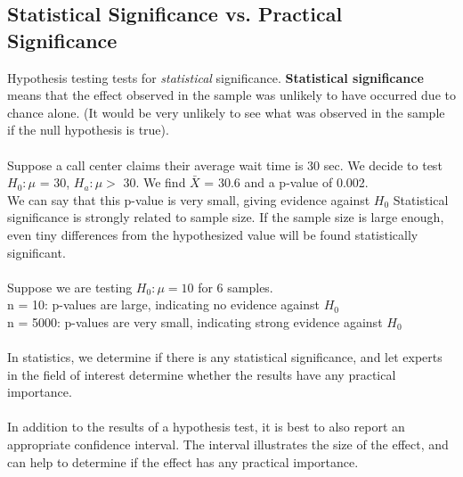 \documentclass[12pt, a4paper]{article}
\begin{document}
	\subsection{Statistical Significance vs. Practical Significance}
	Hypothesis testing tests for \textit{statistical} significance. \textbf{Statistical significance} means that the effect observed in the sample was unlikely to have occurred due to chance alone. (It would be very unlikely to see what was observed in the sample if the null hypothesis is true). \\~\\
	Suppose a call center claims their average wait time is 30 sec. We decide to test \\ $H_0: \mu$ = 30, $H_a: \mu >$ 30. We find $\bar{X}$ = 30.6 and a p-value of 0.002. \\
	We can say that this p-value is very small, giving evidence against $H_0$ \newpage
	\noindent Statistical significance is strongly related to sample size. If the sample size is large enough, even tiny differences from the hypothesized value will be found statistically significant. \\~\\
	Suppose we are testing $H_0: \mu = 10$ for 6 samples. \\
	n = 10: p-values are large, indicating no evidence against $H_0$ \\
	n = 5000: p-values are very small, indicating strong evidence against $H_0$ \\~\\
	In statistics, we determine if there is any statistical significance, and let experts in the field of interest determine whether the results have any practical importance. \\~\\
	In addition to the results of a hypothesis test, it is best to also report an appropriate confidence interval. The interval illustrates the size of the effect, and can help to determine if the effect has any practical importance. \\~\\
	
\end{document}
